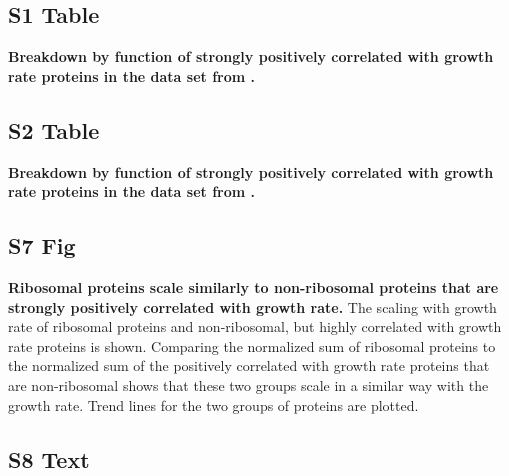 \documentclass[10pt,letterpaper]{article}
\begin{document}
\subsection*{S1 Table}
\bf Breakdown by function of strongly positively correlated with growth rate proteins in the data set from \cite{Schmidt2015}.
\label{tab:corrbreakdownh}

\subsection*{S2 Table}
\bf Breakdown by function of strongly positively correlated with growth rate proteins in the data set from \cite{Peebo_2015}.
\label{tab:corrbreakdownv}

\subsection*{S7 Fig}
\label{fig:ribsnonribs}
    {\bf Ribosomal proteins scale similarly to non-ribosomal proteins that are strongly positively correlated with growth rate.}
 The scaling with growth rate of ribosomal proteins and non-ribosomal, but highly correlated with growth rate proteins is shown.
Comparing the normalized sum of ribosomal proteins to the normalized sum of the positively correlated with growth rate proteins that are non-ribosomal shows that these two groups scale in a similar way with the growth rate.
Trend lines for the two groups of proteins are plotted.
%

\subsection*{S8 Text}
\label{scottcompare}
\end{document}
